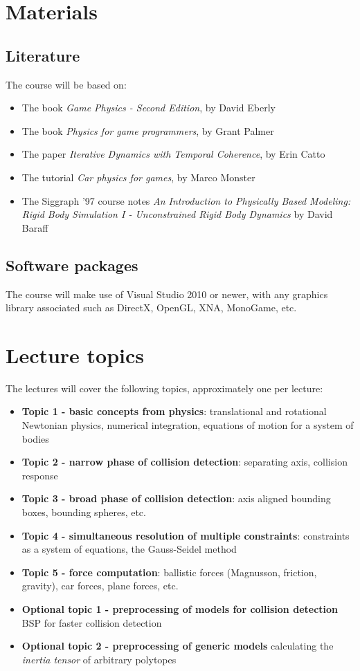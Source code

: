\documentclass{article}
\begin{document}
\section{Materials}
\subsection{Literature}
The course will be based on:

\begin{itemize}
\item The book \textit{Game Physics - Second Edition}, by David Eberly
\item The book \textit{Physics for game programmers}, by Grant Palmer
\item The paper \textit{Iterative Dynamics with Temporal Coherence}, by Erin Catto 
\item The tutorial \textit{Car physics for games}, by Marco Monster
\item The Siggraph '97 course notes \textit{An Introduction to Physically Based Modeling: Rigid Body Simulation I - Unconstrained Rigid Body Dynamics} by David Baraff 
\end{itemize}


\subsection{Software packages}
The course will make use of Visual Studio 2010 or newer, with any graphics library associated such as DirectX, OpenGL, XNA, MonoGame, etc.


\section{Lecture topics}
The lectures will cover the following topics, approximately one per lecture:

\begin{itemize}
\item \textbf{Topic 1 - basic concepts from physics}: translational and rotational Newtonian physics, numerical integration, equations of motion for a system of bodies
\item \textbf{Topic 2 - narrow phase of collision detection}: separating axis, collision response
\item \textbf{Topic 3 - broad phase of collision detection}: axis aligned bounding boxes, bounding spheres, etc.
\item \textbf{Topic 4 - simultaneous resolution of multiple constraints}: constraints as a system of equations, the Gauss-Seidel method
\item \textbf{Topic 5 - force computation}: ballistic forces (Magnusson, friction, gravity), car forces, plane forces, etc. \item \textbf{Optional topic 1 - preprocessing of models for collision detection} BSP for faster collision detection
\item \textbf{Optional topic 2 - preprocessing of generic models} calculating the \textit{inertia tensor} of arbitrary polytopes
\end{itemize}
\end{document}
